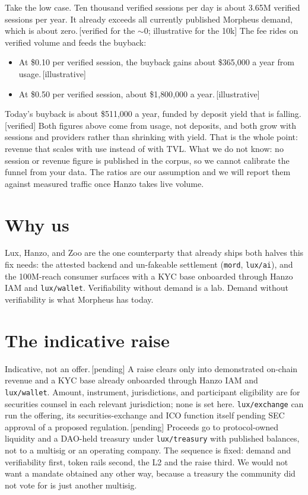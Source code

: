 \documentclass[11pt,a4paper]{article}
\newcommand{\code}[1]{\texttt{\small #1}}
\newcommand{\lab}[1]{{\color{muted}\footnotesize\,[#1]}}
\begin{document}
Take the low case. Ten thousand verified sessions per day is about 3.65M verified
sessions per year. It already exceeds all currently published Morpheus demand,
which is about zero.\lab{verified for the ${\sim}0$; illustrative for the 10k}
The fee rides on verified volume and feeds the buyback:

\begin{itemize}
\item At \$0.10 per verified session, the buyback gains about \$365{,}000 a year
from usage.\lab{illustrative}
\item At \$0.50 per verified session, about \$1{,}800{,}000 a year.\lab{illustrative}
\end{itemize}

Today's buyback is about \$511{,}000 a year, funded by deposit yield that is
falling.\lab{verified} Both figures above come from usage, not deposits, and both
grow with sessions and providers rather than shrinking with yield. That is the
whole point: revenue that scales with use instead of with TVL. What we do not
know: no session or revenue figure is published in the corpus, so we cannot
calibrate the funnel from your data. The ratios are our assumption and we will
report them against measured traffic once Hanzo takes live volume.

\section*{Why us}

Lux, Hanzo, and Zoo are the one counterparty that already ships both halves this
fix needs: the attested backend and un-fakeable settlement (\code{mord},
\code{lux/ai}), and the 100M-reach consumer surfaces with a KYC base onboarded
through Hanzo IAM and \code{lux/wallet}. Verifiability without demand is a lab.
Demand without verifiability is what Morpheus has today.

\section*{The indicative raise}

Indicative, not an offer.\lab{pending} A raise clears only into demonstrated
on-chain revenue and a KYC base already onboarded through Hanzo IAM and
\code{lux/wallet}. Amount, instrument, jurisdictions, and participant eligibility
are for securities counsel in each relevant jurisdiction; none is set here.
\code{lux/exchange} can run the offering, its securities-exchange and ICO function
itself pending SEC approval of a proposed regulation.\lab{pending} Proceeds go to
protocol-owned liquidity and a DAO-held treasury under \code{lux/treasury} with
published balances, not to a multisig or an operating company. The sequence is
fixed: demand and verifiability first, token rails second, the L2 and the raise
third. We would not want a mandate obtained any other way, because a treasury the
community did not vote for is just another multisig.
\end{document}
